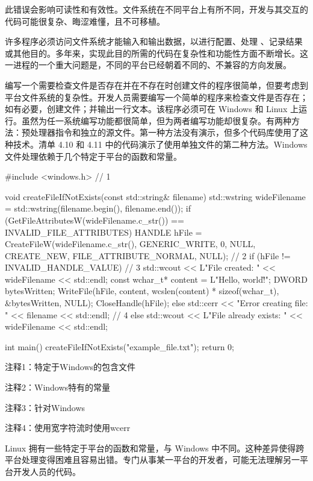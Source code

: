 此错误会影响可读性和有效性。文件系统在不同平台上有所不同，开发与其交互的代码可能很复杂、晦涩难懂，且不可移植。


许多程序必须访问文件系统才能输入和输出数据，以进行配置、处理 、记录结果或其他目的。多年来，实现此目的所需的代码在复杂性和功能性方面不断增长。这一进程的一个重大问题是，不同的平台已经朝着不同的、不兼容的方向发展。

编写一个需要检查文件是否存在并在不存在时创建文件的程序很简单，但要考虑到平台文件系统的复杂性。开发人员需要编写一个简单的程序来检查文件是否存在；如有必要，创建文件；并输出一行文本。该程序必须可在 Windows 和 Linux 上运行。虽然为任一系统编写功能都很简单，但为两者编写功能却很复杂。有两种方法：预处理器指令和独立的源文件。第一种方法没有演示，但多个代码库使用了这种技术。清单 4.10 和 4.11 中的代码演示了使用单独文件的第二种方法。Windows 文件处理依赖于几个特定于平台的函数和常量。


\begin{cpp}
#include <windows.h> // 1

void createFileIfNotExists(const std::string& filename) {
  std::wstring wideFilename = std::wstring(filename.begin(), filename.end());
  if (GetFileAttributesW(wideFilename.c_str()) == INVALID_FILE_ATTRIBUTES) {
    HANDLE hFile = CreateFileW(wideFilename.c_str(), GENERIC_WRITE, 0,
    NULL, CREATE_NEW,
    FILE_ATTRIBUTE_NORMAL, NULL); // 2
    if (hFile != INVALID_HANDLE_VALUE) { // 3
      std::wcout << L"File created: " << wideFilename << std::endl;
      const wchar_t* content = L"Hello, world!\r\n";
      DWORD bytesWritten;
      WriteFile(hFile, content, wcslen(content) * sizeof(wchar_t),
      &bytesWritten, NULL);
      CloseHandle(hFile);
    } else
      std::cerr << "Error creating file: " << filename << std::endl; // 4
    } else
      std::wcout << L"File already exists: " << wideFilename << std::endl;
}

int main() {
  createFileIfNotExists("example_file.txt");
  return 0;
}
\end{cpp}

{\footnotesize
注释1：特定于Windows的包含文件

注释2：Windows特有的常量

注释3：针对Windows

注释4：使用宽字符流时使用wcerr
}

Linux 拥有一些特定于平台的函数和常量，与 Windows 中不同。这种差异使得跨平台处理变得困难且容易出错。专门从事某一平台的开发者，可能无法理解另一平台开发人员的代码。

